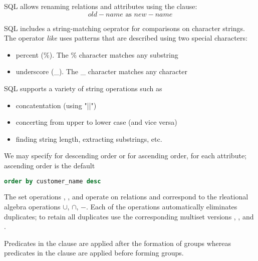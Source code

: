 \documentclass{article}
\begin{document}
SQL allows renaming relations and attributes using the  clause: $$old-name \textrm{ as } new-name$$

SQL includes a string-matching oeprator for comparisons on character strings. The operator \emph{like} uses patterns that are described using two special characters: 
\begin{itemize}
  \item percent (\%). The \% character matches any substring 
  \item underscore (\_). The \_ character matches any character
\end{itemize}
SQL supports a variety of string operations such as 
\begin{itemize}
  \item concatentation (using "||")
  \item concerting from upper to lower case (and vice versa) 
  \item finding string length, extracting substrings, etc.
\end{itemize}

We may specify  for descending order or  for ascending order, for each attribute; ascending order is the default 
\begin{lstlisting}[language=SQL]
  order by customer_name desc
\end{lstlisting}

The set operations , , and  operate on relations and correspond to the rleational algebra operations $\cup$, $\cap$, $-$. Each of the operations automatically eliminates duplicates; to retain all duplicates use the corresponding multiset versions , , and . 

\begin{remark}
  Predicates in the  clause are applied after the formation of groups whereas predicates in the  clause are applied before forming groups. 
\end{remark}
\end{document}
